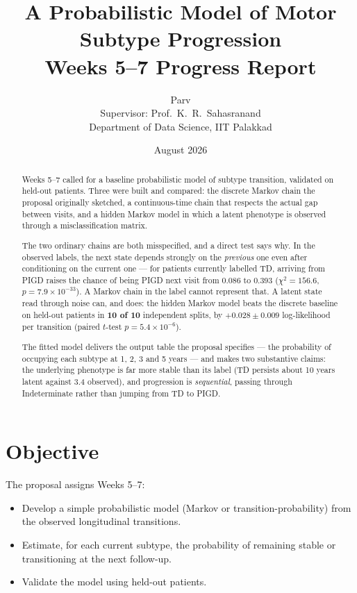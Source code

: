 \documentclass[11pt,a4paper]{article}
\title{\textbf{A Probabilistic Model of Motor Subtype Progression}\\[0.6em]
       \large Weeks 5--7 Progress Report}
\author{Parv\\[0.3em]
        \small Supervisor: Prof.\ K.~R.\ Sahasranand\\
        \small Department of Data Science, IIT Palakkad}
\date{August 2026}
\begin{document}
\maketitle

\begin{abstract}
\noindent
Weeks 5--7 called for a baseline probabilistic model of subtype transition,
validated on held-out patients. Three were built and compared: the discrete
Markov chain the proposal originally sketched, a continuous-time chain that
respects the actual gap between visits, and a hidden Markov model in which a
latent phenotype is observed through a misclassification matrix.

The two ordinary chains are both misspecified, and a direct test says why. In
the observed labels, the next state depends strongly on the \emph{previous}
one even after conditioning on the current one --- for patients currently
labelled TD, arriving from PIGD raises the chance of being PIGD next visit from
0.086 to 0.393 ($\chi^2 = 156.6$, $p = 7.9 \times 10^{-33}$). A Markov chain in
the label cannot represent that. A latent state read through noise can, and
does: the hidden Markov model beats the discrete baseline on held-out patients
in \textbf{10 of 10} independent splits, by $+0.028 \pm 0.009$ log-likelihood
per transition (paired $t$-test $p = 5.4 \times 10^{-6}$).

The fitted model delivers the output table the proposal specifies --- the
probability of occupying each subtype at 1, 2, 3 and 5 years --- and makes two
substantive claims: the underlying phenotype is far more stable than its label
(TD persists about 10 years latent against 3.4 observed), and progression is
\emph{sequential}, passing through Indeterminate rather than jumping from TD
to PIGD.
\end{abstract}

\vspace{0.3em}

\section{Objective}

The proposal assigns Weeks 5--7:

\begin{itemize}
  \item Develop a simple probabilistic model (Markov or transition-probability)
        from the observed longitudinal transitions.
  \item Estimate, for each current subtype, the probability of remaining stable
        or transitioning at the next follow-up.
  \item Validate the model using held-out patients.
\end{itemize}
\end{document}
